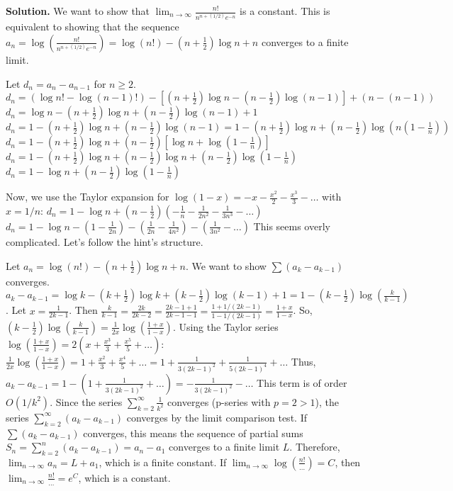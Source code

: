 \noindent\textbf{Solution.}
We want to show that $\lim_{n\to\infty}\frac{n!}{n^{n+(1/2)}e^{-n}}$ is a constant. This is equivalent to showing that the sequence $a_n = \log\left(\frac{n!}{n^{n+(1/2)}e^{-n}}\right) = \log(n!) - (n+\frac{1}{2})\log n + n$ converges to a finite limit.

Let $d_n = a_n - a_{n-1}$ for $n \geq 2$.
$d_n = (\log n! - \log(n-1)!) - [(n+\frac{1}{2})\log n - (n-\frac{1}{2})\log(n-1)] + (n-(n-1))$
$d_n = \log n - (n+\frac{1}{2})\log n + (n-\frac{1}{2})\log(n-1) + 1$
$d_n = 1 - (n+\frac{1}{2})\log n + (n-\frac{1}{2})\log(n-1) = 1 - (n+\frac{1}{2})\log n + (n-\frac{1}{2})\log\left(n(1-\frac{1}{n})\right)$
$d_n = 1 - (n+\frac{1}{2})\log n + (n-\frac{1}{2})\left[\log n + \log(1-\frac{1}{n})\right]$
$d_n = 1 - (n+\frac{1}{2})\log n + (n-\frac{1}{2})\log n + (n-\frac{1}{2})\log(1-\frac{1}{n})$
$d_n = 1 - \log n + (n-\frac{1}{2})\log(1-\frac{1}{n})$

Now, we use the Taylor expansion for $\log(1-x) = -x - \frac{x^2}{2} - \frac{x^3}{3} - \dots$ with $x = 1/n$:
$d_n = 1 - \log n + (n-\frac{1}{2}) \left(-\frac{1}{n} - \frac{1}{2n^2} - \frac{1}{3n^3} - \dots\right)$
$d_n = 1 - \log n - (1 - \frac{1}{2n}) - (\frac{1}{2n} - \frac{1}{4n^2}) - (\frac{1}{3n^2} - \dots)$
This seems overly complicated. Let's follow the hint's structure.

Let $a_n = \log(n!) - (n+\frac{1}{2})\log n + n$. We want to show $\sum (a_{k}-a_{k-1})$ converges.
$a_k-a_{k-1} = \log k - (k+\frac{1}{2})\log k + (k-\frac{1}{2})\log(k-1) + 1 = 1 - (k-\frac{1}{2})\log(\frac{k}{k-1})$.
Let $x = \frac{1}{2k-1}$. Then $\frac{k}{k-1} = \frac{2k}{2k-2} = \frac{2k-1+1}{2k-1-1} = \frac{1+1/(2k-1)}{1-1/(2k-1)} = \frac{1+x}{1-x}$.
So, $(k-\frac{1}{2})\log(\frac{k}{k-1}) = \frac{1}{2x} \log(\frac{1+x}{1-x})$.
Using the Taylor series $\log(\frac{1+x}{1-x}) = 2(x + \frac{x^3}{3} + \frac{x^5}{5} + \dots)$:
$\frac{1}{2x} \log(\frac{1+x}{1-x}) = 1 + \frac{x^2}{3} + \frac{x^4}{5} + \dots = 1 + \frac{1}{3(2k-1)^2} + \frac{1}{5(2k-1)^4} + \dots$
Thus, $a_k - a_{k-1} = 1 - (1 + \frac{1}{3(2k-1)^2} + \dots) = -\frac{1}{3(2k-1)^2} - \dots$
This term is of order $O(1/k^2)$. Since the series $\sum_{k=2}^\infty \frac{1}{k^2}$ converges (p-series with $p=2>1$), the series $\sum_{k=2}^\infty (a_k-a_{k-1})$ converges by the limit comparison test.
If $\sum (a_k-a_{k-1})$ converges, this means the sequence of partial sums $S_n = \sum_{k=2}^n (a_k-a_{k-1}) = a_n - a_1$ converges to a finite limit $L$.
Therefore, $\lim_{n\to\infty} a_n = L+a_1$, which is a finite constant.
If $\lim_{n\to\infty} \log(\frac{n!}{\dots}) = C$, then $\lim_{n\to\infty} \frac{n!}{\dots} = e^C$, which is a constant.

